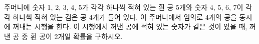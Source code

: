 주머니에 숫자 1, 2, 3, 4, 5가 각각 하나씩 적혀 있는 흰 공 5개와 숫자 4, 5, 6, 7이 각각 하나씩 적혀 있는 검은 공 4개가 들어 있다. 이 주머니에서 임의로 4개의 공을 동시에 꺼내는 시행을 한다. 이 시행에서 꺼낸 공에 적혀 있는 숫자가 같은 것이 있을 때, 꺼낸 공 중 흰 공이 2개일 확률을 구하시오.
